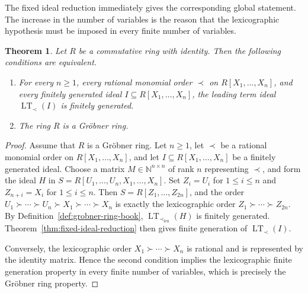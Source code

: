 \documentclass[preprint,12pt,3p]{elsarticle}
\newtheorem{theorem}{Theorem}[section]
\theoremstyle{definition}
\theoremstyle{remark}
\newcommand{\LT}{\operatorname{LT}}
\begin{document}
	The fixed ideal reduction immediately gives the corresponding global
	statement. The increase in the number of variables is the reason that
	the lexicographic hypothesis must be imposed in every finite number
	of variables.
	
	\begin{theorem}
		\label{thm:rational-characterization-grobner-rings}
		Let $R$ be a commutative ring with identity. Then the following
		conditions are equivalent.
		\begin{enumerate}
			\item[(1)] For every $n\geq 1$, every rational monomial order
			$\prec$ on $R[X_1,\ldots,X_n]$, and every finitely generated
			ideal $I\subseteq R[X_1,\ldots,X_n]$, the leading term ideal
			$\LT_\prec(I)$ is finitely generated.
			
			\item[(2)] The ring $R$ is a Gr\"obner ring.
		\end{enumerate}
	\end{theorem}
	
	\begin{proof}
		Assume that $R$ is a Gr\"obner ring. Let $n\geq 1$, let $\prec$
		be a rational monomial order on $R[X_1,\ldots,X_n]$, and let
		$I\subseteq R[X_1,\ldots,X_n]$ be a finitely generated ideal.
		Choose a matrix $M\in\mathbb N^{n\times n}$ of rank $n$ representing
		$\prec$, and form the ideal $H$ in
		$S=R[U_1,\ldots,U_n,X_1,\ldots,X_n]$. Set $Z_i=U_i$ for
		$1\leq i\leq n$ and $Z_{n+i}=X_i$ for $1\leq i\leq n$. Then
		$S=R[Z_1,\ldots,Z_{2n}]$, and the order
		$U_1\succ\cdots\succ U_n\succ X_1\succ\cdots\succ X_n$ is exactly
		the lexicographic order $Z_1\succ\cdots\succ Z_{2n}$. By
		Definition~\ref{def:grobner-ring-book},
		$\LT_{\prec_{\mathrm{lex}}}(H)$ is finitely generated.
		Theorem~\ref{thm:fixed-ideal-reduction} then gives finite generation
		of $\LT_\prec(I)$.
		
		Conversely, the lexicographic order
		$X_1\succ\cdots\succ X_n$ is rational and is represented by the
		identity matrix. Hence the second condition implies the
		lexicographic finite generation property in every finite number of
		variables, which is precisely the Gr\"obner ring property.
	\end{proof}
	
\end{document}
